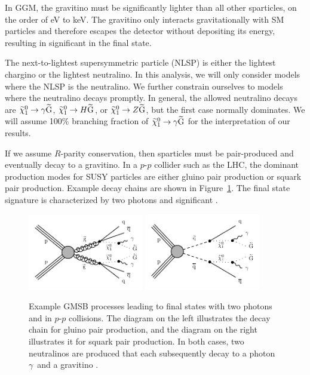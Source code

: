 In GGM, the gravitino must be significantly lighter than all other sparticles, on the order of eV to keV. The gravitino only interacts
gravitationally with SM particles and therefore escapes the detector without depositing its energy, resulting in 
significant \ETmiss in the final state.

The next-to-lightest supersymmetric particle (NLSP) is either the lightest chargino or the lightest neutralino.
In this analysis, we will only consider models where the NLSP is the neutralino. We further constrain 
ourselves to models where the neutralino decays promptly. In general, the allowed neutralino decays are
$\widetilde{\chi}^{0}_{1} \rightarrow \gamma\widetilde{\mathrm{G}}$, $\widetilde{\chi}^{0}_{1} \rightarrow H\widetilde{\mathrm{G}}$, or $\widetilde{\chi}^{0}_{1} \rightarrow Z\widetilde{\mathrm{G}}$,
but the first case normally dominates. We will assume 100\% branching fraction of $\widetilde{\chi}^{0}_{1} \rightarrow \gamma\widetilde{\mathrm{G}}$
for the interpretation of our results.

If we assume $R$-parity conservation, then sparticles must be pair-produced and eventually decay to a gravitino. 
In a $p$-$p$ collider such as the LHC, the dominant production modes for SUSY particles are either gluino pair production
or squark pair production. Example decay chains are shown in Figure~\ref{fig:gluinoSquarkDecay1}. The final state 
signature is characterized by two photons and significant \ETmiss.

\begin{figure}[htbp]
    \centering
    \includegraphics[width=0.45\textwidth]{Figures/Results/gluinoDecay.pdf}
    \includegraphics[width=0.45\textwidth]{Figures/Results/squarkDecay.pdf}
    \caption{Example GMSB processes leading to final states with two photons 
   	 and \ETmiss in $p$-$p$ collisions.
        The diagram on the left illustrates the decay chain for gluino pair production, and 
        the diagram on the right illustrates it for squark pair production. In both cases, 
        two neutralinos \neutralino are produced that each subsequently decay to a photon $\gamma$~and a gravitino \gravitino.
        }
    \label{fig:gluinoSquarkDecay1}
\end{figure}

